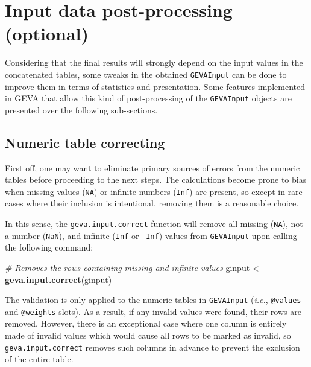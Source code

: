 \documentclass[
  12pt,
]{article}
\newenvironment{Shaded}{\begin{snugshade}}{\end{snugshade}}
\newcommand{\CommentTok}[1]{\textcolor[rgb]{0.56,0.35,0.01}{\textit{#1}}}
\newcommand{\KeywordTok}[1]{\textcolor[rgb]{0.13,0.29,0.53}{\textbf{#1}}}
\newcommand{\NormalTok}[1]{#1}
\newcommand{\StringTok}[1]{\textcolor[rgb]{0.31,0.60,0.02}{#1}}
\begin{document}
\hypertarget{input-data-post-processing-optional}{%
\section{Input data post-processing
(optional)}\label{input-data-post-processing-optional}}

Considering that the final results will strongly depend on the input
values in the concatenated tables, some tweaks in the obtained
\texttt{GEVAInput} can be done to improve them in terms of statistics
and presentation. Some features implemented in GEVA that allow this kind
of post-processing of the \texttt{GEVAInput} objects are presented over
the following sub-sections.

\hypertarget{numeric-table-correcting}{%
\subsection{Numeric table correcting}\label{numeric-table-correcting}}

First off, one may want to eliminate primary sources of errors from the
numeric tables before proceeding to the next steps. The calculations
become prone to bias when missing values (\texttt{NA}) or infinite
numbers (\texttt{Inf}) are present, so except in rare cases where their
inclusion is intentional, removing them is a reasonable choice.

In this sense, the \texttt{geva.input.correct} function will remove all
missing (\texttt{NA}), not-a-number (\texttt{NaN}), and infinite
(\texttt{Inf} or \texttt{-Inf}) values from \texttt{GEVAInput} upon
calling the following command:

\begin{Shaded}
\begin{Highlighting}[]
\CommentTok{# Removes the rows containing missing and infinite values}
\NormalTok{ginput <-}\StringTok{ }\KeywordTok{geva.input.correct}\NormalTok{(ginput)}
\end{Highlighting}
\end{Shaded}

The validation is only applied to the numeric tables in
\texttt{GEVAInput} (\emph{i.e.}, \texttt{@values} and \texttt{@weights}
slots). As a result, if any invalid values were found, their rows are
removed. However, there is an exceptional case where one column is
entirely made of invalid values which would cause all rows to be marked
as invalid, so \texttt{geva.input.correct} removes such columns in
advance to prevent the exclusion of the entire table.
\end{document}
